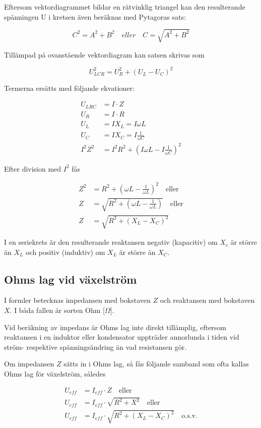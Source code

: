 Eftersom vektordiagrammet bildar en rätvinklig triangel kan den resulterande
spänningen U i kretsen även beräknas med Pytagoras sats:

\[C^2 = A^2 + B^2 \quad eller \quad C = \sqrt{A^2 + B^2}\]

Tillämpad på ovanstående vektordiagram kan satsen skrivas som

\[U_{LCR}^2 = U_R^2 + ( U_L - U_C)^2\]

Termerna ersätts med följande ekvationer:

\begin{align*}
  U_{LRC} &= I \cdot Z \\
  U_R &= I \cdot R \\
  U_L &= I X_L = I \omega L \\
  U_C &= I X_C = I \frac{1}{\omega C} \\
  I^2 Z^2 &= I^2 R^2 + ( I \omega L - I\frac{1}{\omega C})^2
\end{align*}

Efter division med \(I^2\) fås

\begin{align*}
  Z^2 &= R^2 + ( \omega L - \frac{1}{\omega L} )^2 \quad \text{eller} \\
  Z &= \sqrt{R^2 + (\omega L - \frac{1}{\omega L})} \quad \text{eller} \\
  Z &= \sqrt{R^2 + (X_L - X_C)^2}
\end{align*}

I en seriekrets är den resulterande reaktansen negativ (kapacitiv) om \(X_c\) är
större än \(X_L\) och positiv (induktiv) om \(X_L\) är större än \(X_C\).

\subsection{Ohms lag vid växelström}

I formler betecknas impedansen med bokstaven \(Z\) och reaktansen med bokstaven
\(X\). I båda fallen är sorten Ohm [\(Ω\)].

Vid beräkning av impedans är Ohms lag inte direkt tillämplig, eftersom
reaktansen i en induktor eller kondensator uppträder annorlunda i tiden vid
ström- respektive spänningsändring än vad resistansen gör.

Om impedansen \(Z\) sätts in i Ohms lag, så fås följande samband som ofta kallas
Ohms lag för växelström, således

\begin{align*}
  U_{eff} &= I_{eff} \cdot Z \quad \text{eller} \\
  U_{eff} &= I_{eff} \cdot \sqrt{R^2 + X^2} \quad \text{eller} \\
  U_{eff} &= I_{eff} \cdot \sqrt{R^2 + (X_L - X_C)^2} \quad \text{o.s.v.}
\end{align*}


